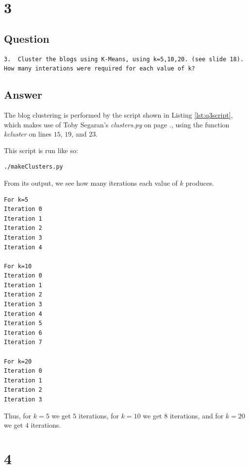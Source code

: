 \documentclass[letterpaper,11pt]{article}
\begin{document}
\clearpage

\section*{3}

\subsection*{Question}

\begin{verbatim}
3.  Cluster the blogs using K-Means, using k=5,10,20. (see slide 18).
How many interations were required for each value of k?
\end{verbatim}

\subsection*{Answer}

The blog clustering is performed by the script shown in Listing \ref{lst:q3script}, which makes use of Toby Segaran's \emph{clusters.py} \cite{pci} on page \pageref{lst:appSegaran2}., using the function \emph{kcluster} on lines $15$, $19$, and $23$.



This script is run like so:

\begin{lstlisting}[frame=single]
./makeClusters.py
\end{lstlisting}

\newpage
From its output, we see how many iterations each value of $k$ produces.
\begin{lstlisting}[frame=single]
For k=5
Iteration 0
Iteration 1
Iteration 2
Iteration 3
Iteration 4

For k=10
Iteration 0
Iteration 1
Iteration 2
Iteration 3
Iteration 4
Iteration 5
Iteration 6
Iteration 7

For k=20
Iteration 0
Iteration 1
Iteration 2
Iteration 3
\end{lstlisting}

Thus, for $k=5$ we get $5$ iterations, for $k=10$ we get $8$ iterations, and for $k=20$ we get $4$ iterations.

\newpage

\section*{4}
\end{document}
